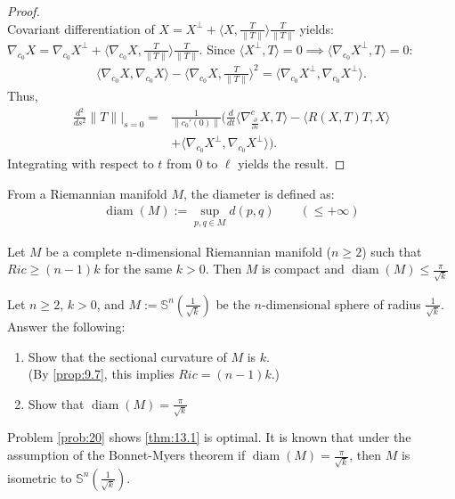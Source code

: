 \begin{proof}
\[    \]
    Covariant differentiation of $X = X^{\perp} + \langle X, \frac{T}{\|T\|} \rangle \frac{T}{\|T\|}$ yields:
    $\nabla_{c_0} X = \nabla_{c_0} X^{\perp} + \langle \nabla_{c_0} X, \frac{T}{\|T\|}\rangle \frac{T}{\|T\|}$.
    Since $\langle X^{\perp}, T \rangle = 0 \implies \langle \nabla_{c_0} X^{\perp},T \rangle =0:$
    \[
    \begin{aligned}
        \langle \nabla_{c_0} X, \nabla_{c_0} X \rangle - \langle \nabla_{c_0}X, \frac{T}{\|T\|} \rangle^2 = \langle \nabla_{c_0} X^{\perp}, \nabla_{c_0} X^{\perp} \rangle.
    \end{aligned}
    \]
    Thus,
    \[
    \begin{aligned}
        \frac{d^2}{ds^2} \|T\| |_{s=0} =& \frac{1}{\|c_0'(0)\|}\Bigg(\frac{d}{dt} \langle \nabla^c_{\frac{\partial}{\partial s}} X, T \rangle - \langle R(X,T)T,X \rangle \\
        &+\langle \nabla_{c_0} X^{\perp}, \nabla_{c_0} X^{\perp} \rangle \Bigg).
    \end{aligned}
    \]
    Integrating with respect to $t$ from $0$ to $\ell$ yields the result.
\end{proof}

From a Riemannian manifold $M$, the diameter is defined as:
\[
\begin{aligned}
    \operatorname{diam}(M) := \sup_{p,q \in M} d(p,q) \qquad (\leq + \infty)
\end{aligned}
\]

\begin{theorem}
    Let $M$ be a complete n-dimensional Riemannian manifold ($n \geq 2$) such that
    $Ric \geq (n-1)k$ for the same $k>0$.
    Then $M$ is compact and $\operatorname{diam}(M) \leq \frac{\pi}{\sqrt{k}}$
    \label{thm:13.2}
\end{theorem}

\begin{problem}
    Let $n \geq 2$, $k>0$, and $M:= \mathbb{S}^n (\frac{1}{\sqrt{k}})$ be the $n$-dimensional sphere of radius $\frac{1}{\sqrt{k}}$.
    Answer the following:
    \begin{enumerate}
        \item Show that the sectional curvature of $M$ is $k$. \\
        (By \autoref{prop:9.7}, this implies $Ric = (n-1)k$.)
        \item Show that $\operatorname{diam}(M) = \frac{\pi}{\sqrt{k}}$
    \end{enumerate}
    \label{prob:20}
\end{problem}
Problem \autoref{prob:20} shows \autoref{thm:13.1} is optimal. It is known that under the assumption of the Bonnet-Myers theorem if
$\operatorname{diam}(M) = \frac{\pi}{\sqrt{k}}$, then $M$ is isometric to $\mathbb{S}^n (\frac{1}{\sqrt{k}})$.


